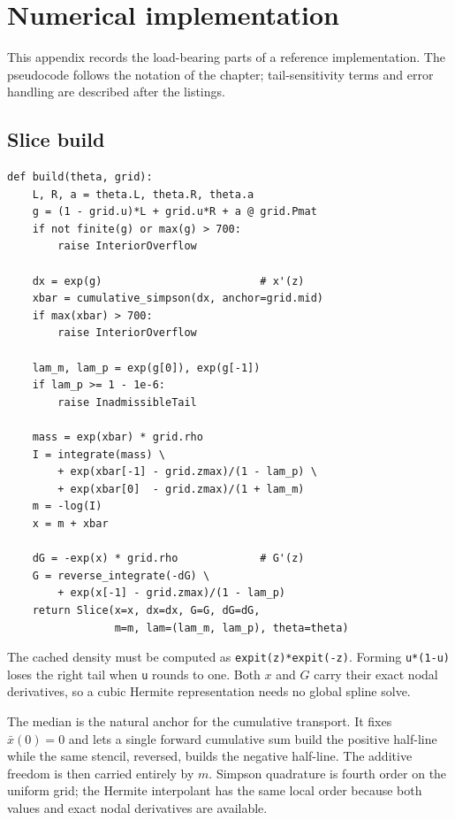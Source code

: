 \section{Numerical implementation}
\label{app:implementation}

This appendix records the load-bearing parts of a reference implementation.
The pseudocode follows the notation of the chapter; tail-sensitivity terms and
error handling are described after the listings.

\subsection{Slice build}

\begin{lstlisting}[caption={Build the transport and ledger on one fixed grid.}]
def build(theta, grid):
    L, R, a = theta.L, theta.R, theta.a
    g = (1 - grid.u)*L + grid.u*R + a @ grid.Pmat
    if not finite(g) or max(g) > 700:
        raise InteriorOverflow

    dx = exp(g)                         # x'(z)
    xbar = cumulative_simpson(dx, anchor=grid.mid)
    if max(xbar) > 700:
        raise InteriorOverflow

    lam_m, lam_p = exp(g[0]), exp(g[-1])
    if lam_p >= 1 - 1e-6:
        raise InadmissibleTail

    mass = exp(xbar) * grid.rho
    I = integrate(mass) \
        + exp(xbar[-1] - grid.zmax)/(1 - lam_p) \
        + exp(xbar[0]  - grid.zmax)/(1 + lam_m)
    m = -log(I)
    x = m + xbar

    dG = -exp(x) * grid.rho             # G'(z)
    G = reverse_integrate(-dG) \
        + exp(x[-1] - grid.zmax)/(1 - lam_p)
    return Slice(x=x, dx=dx, G=G, dG=dG,
                 m=m, lam=(lam_m, lam_p), theta=theta)
\end{lstlisting}

The cached density must be computed as
\texttt{expit(z)*expit(-z)}.  Forming \texttt{u*(1-u)} loses the right tail
when \texttt{u} rounds to one.  Both $x$ and $G$ carry their exact nodal
derivatives, so a cubic Hermite representation needs no global spline solve.

The median is the natural anchor for the cumulative transport.  It fixes
$\bar x(0)=0$ and lets a single forward cumulative sum build the positive
half-line while the same stencil, reversed, builds the negative half-line.
The additive freedom is then carried entirely by $m$.  Simpson quadrature is
fourth order on the uniform grid; the Hermite interpolant has the same local
order because both values and exact nodal derivatives are available.

